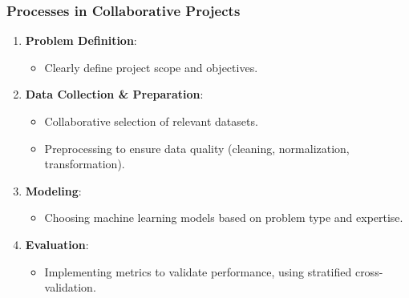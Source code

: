 \documentclass[aspectratio=169]{beamer}
\begin{document}
\begin{frame}
    \frametitle{Processes in Collaborative Projects}
    \begin{enumerate}
        \item \textbf{Problem Definition}:
            \begin{itemize}
                \item Clearly define project scope and objectives.
            \end{itemize}
        
        \item \textbf{Data Collection \& Preparation}:
            \begin{itemize}
                \item Collaborative selection of relevant datasets.
                \item Preprocessing to ensure data quality (cleaning, normalization, transformation).
            \end{itemize}
        
        \item \textbf{Modeling}:
            \begin{itemize}
                \item Choosing machine learning models based on problem type and expertise.
            \end{itemize}
        
        \item \textbf{Evaluation}:
            \begin{itemize}
                \item Implementing metrics to validate performance, using stratified cross-validation.
            \end{itemize}
    \end{enumerate}
\end{frame}
\end{document}
